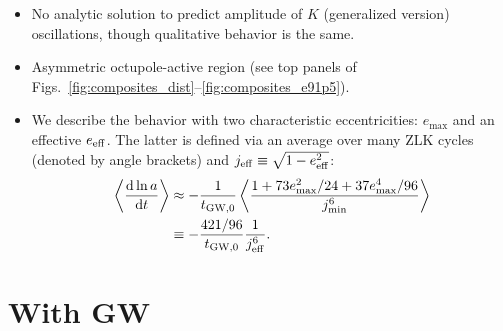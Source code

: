 \documentclass[
        fleqn,
        usenatbib,
    ]{mnras}
\newcommand*{\rd}[2]{\frac{\mathrm{d}#1}{\mathrm{d}#2}}
\newcommand*{\ev}[1]{\left\langle#1\right\rangle}
\begin{document}
\begin{itemize}
    \item No analytic solution to predict amplitude of $K$ (generalized version)
        oscillations, though qualitative behavior is the same.

    \item Asymmetric octupole-active region (see top panels of
        Figs.~\ref{fig:composites_dist}--\ref{fig:composites_e91p5}).

    \item We describe the behavior with two characteristic eccentricities:
        $e_{\max}$ and an effective $e_{\rm eff}$. The latter is defined via an
        average over many ZLK cycles (denoted by angle brackets) and $j_{\rm
        eff} \equiv \sqrt{1 - e_{\rm eff}^2}$:
        \begin{align}
            \ev{\rd{\ln a}{t}} &\approx -\frac{1}{t_{\rm GW, 0}}
                    \ev{\frac{1 + 73e_{\max}^2/24 + 37e_{\max}^4/96}
                        {j_{\min}^6}}\nonumber\\
                &\equiv -\frac{421/96}{t_{\rm GW, 0}}\frac{1}{j_{\rm eff}^6}.
                \label{eq:def_e_eff}
        \end{align}
\end{itemize}

\section{With GW}\label{s:with_gw}
\end{document}
